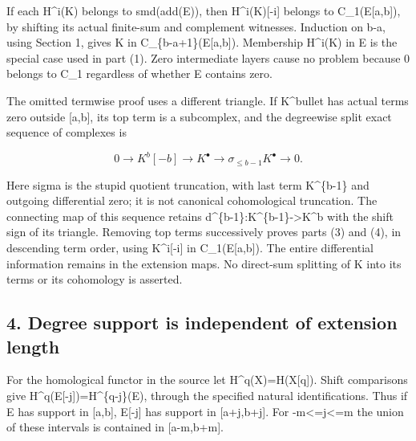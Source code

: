 If each H\textasciicircum{}i(K)\allowbreak{} belongs to smd(add(E)\allowbreak{})\allowbreak{},\allowbreak{} then H\textasciicircum{}i(K)\allowbreak{}[-i]\allowbreak{} belongs to C\_\allowbreak{}1(E[a,\allowbreak{}b]\allowbreak{})\allowbreak{},\allowbreak{} by shifting its actual finite-sum and complement witnesses. Induction on b-a,\allowbreak{} using Section 1,\allowbreak{} gives K in C\_\allowbreak{}\{b-a\allowbreak{}+1\}(E[a,\allowbreak{}b]\allowbreak{})\allowbreak{}. Membership H\textasciicircum{}i(K)\allowbreak{} in E is the special case used in part (1)\allowbreak{}. Zero intermediate layers cause no problem because 0 belongs to C\_\allowbreak{}1 regardless of whether E contains zero.

The omitted termwise proof uses a different triangle. If K\^{}bullet has actual terms zero outside [a,\allowbreak{}b]\allowbreak{},\allowbreak{} its top term is a subcomplex,\allowbreak{} and the degreewise split exact sequence of complexes is

\[
 0\longrightarrow K^b[-b]\longrightarrow K^\bullet
   \longrightarrow \sigma_{\leq b-1}K^\bullet\longrightarrow0.
\]

Here sigma is the stupid quotient truncation,\allowbreak{} with last term K\^{}\{b-1\} and outgoing differential zero; it is not canonical cohomological truncation. The connecting map of this sequence retains d\textasciicircum{}\{b-1\}:\allowbreak{}K\textasciicircum{}\{b-1\}\allowbreak{}->K\textasciicircum{}b with the shift sign of its triangle. Removing top terms successively proves parts (3)\allowbreak{} and (4)\allowbreak{},\allowbreak{} in descending term order,\allowbreak{} using K\textasciicircum{}i[-i]\allowbreak{} in C\_\allowbreak{}1(E[a,\allowbreak{}b]\allowbreak{})\allowbreak{}. The entire differential information remains in the extension maps. No direct-sum splitting of K into its terms or its cohomology is asserted.

\subsection{4. Degree support is independent of extension length}\label{proofs-10691-11108-degree-support-is-independent-of-extension-length}

For the homological functor in the source let H\textasciicircum{}q(X)\allowbreak{}\allowbreak{}=H(X[q]\allowbreak{})\allowbreak{}. Shift comparisons give H\textasciicircum{}q(E[-j]\allowbreak{})\allowbreak{}\allowbreak{}=H\textasciicircum{}\{q-j\}(E)\allowbreak{},\allowbreak{} through the specified natural identifications. Thus if E has support in [a,\allowbreak{}b]\allowbreak{},\allowbreak{} E[-j]\allowbreak{} has support in [a\allowbreak{}+j,\allowbreak{}b\allowbreak{}+j]\allowbreak{}. For -m<\allowbreak{}=j<\allowbreak{}=m the union of these intervals is contained in [a-m,\allowbreak{}b\allowbreak{}+m]\allowbreak{}.

